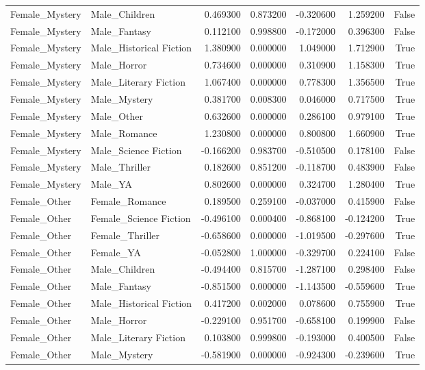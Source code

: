 \begin{tabular}{llrrrrr}
Female_Mystery & Male_Children & 0.469300 & 0.873200 & -0.320600 & 1.259200 & False \\
Female_Mystery & Male_Fantasy & 0.112100 & 0.998800 & -0.172000 & 0.396300 & False \\
Female_Mystery & Male_Historical Fiction & 1.380900 & 0.000000 & 1.049000 & 1.712900 & True \\
Female_Mystery & Male_Horror & 0.734600 & 0.000000 & 0.310900 & 1.158300 & True \\
Female_Mystery & Male_Literary Fiction & 1.067400 & 0.000000 & 0.778300 & 1.356500 & True \\
Female_Mystery & Male_Mystery & 0.381700 & 0.008300 & 0.046000 & 0.717500 & True \\
Female_Mystery & Male_Other & 0.632600 & 0.000000 & 0.286100 & 0.979100 & True \\
Female_Mystery & Male_Romance & 1.230800 & 0.000000 & 0.800800 & 1.660900 & True \\
Female_Mystery & Male_Science Fiction & -0.166200 & 0.983700 & -0.510500 & 0.178100 & False \\
Female_Mystery & Male_Thriller & 0.182600 & 0.851200 & -0.118700 & 0.483900 & False \\
Female_Mystery & Male_YA & 0.802600 & 0.000000 & 0.324700 & 1.280400 & True \\
Female_Other & Female_Romance & 0.189500 & 0.259100 & -0.037000 & 0.415900 & False \\
Female_Other & Female_Science Fiction & -0.496100 & 0.000400 & -0.868100 & -0.124200 & True \\
Female_Other & Female_Thriller & -0.658600 & 0.000000 & -1.019500 & -0.297600 & True \\
Female_Other & Female_YA & -0.052800 & 1.000000 & -0.329700 & 0.224100 & False \\
Female_Other & Male_Children & -0.494400 & 0.815700 & -1.287100 & 0.298400 & False \\
Female_Other & Male_Fantasy & -0.851500 & 0.000000 & -1.143500 & -0.559600 & True \\
Female_Other & Male_Historical Fiction & 0.417200 & 0.002000 & 0.078600 & 0.755900 & True \\
Female_Other & Male_Horror & -0.229100 & 0.951700 & -0.658100 & 0.199900 & False \\
Female_Other & Male_Literary Fiction & 0.103800 & 0.999800 & -0.193000 & 0.400500 & False \\
Female_Other & Male_Mystery & -0.581900 & 0.000000 & -0.924300 & -0.239600 & True \\

\end{tabular}
